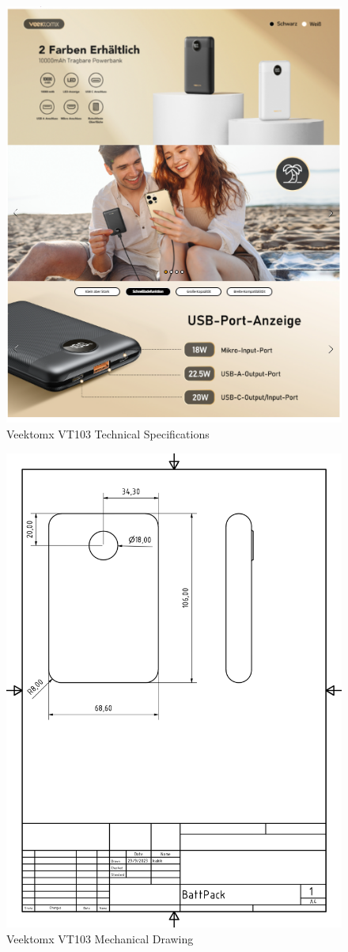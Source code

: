 \begin{figure}[H]
    \centering
    \includegraphics[width=0.85\linewidth]{texs/appendix/data/techspecs/battspecs.png}
    \caption{Veektomx VT103 Technical Specifications }
    \label{fig:battery-1}
\end{figure}

\begin{figure}[H]
    \centering
    \includegraphics[width=0.85\linewidth]{texs/appendix/data/techspecs/battmechdraw.jpg}
    \caption{Veektomx VT103 Mechanical Drawing }
    \label{fig:battery-2}
\end{figure}


